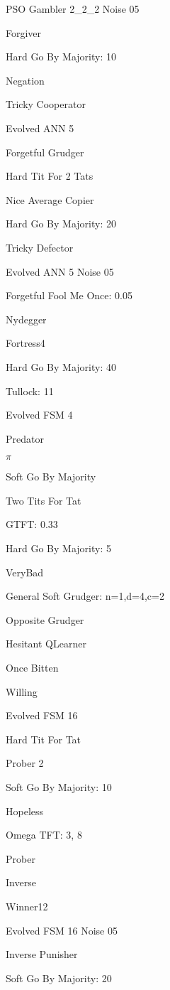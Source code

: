 \item PSO Gambler 2\_2\_2 Noise 05
\item Forgiver
\item Hard Go By Majority: 10
\item Negation
\item Tricky Cooperator
\item Evolved ANN 5
\item Forgetful Grudger
\item Hard Tit For 2 Tats
\item Nice Average Copier
\item Hard Go By Majority: 20
\item Tricky Defector
\item Evolved ANN 5 Noise 05
\item Forgetful Fool Me Once: 0.05
\item Nydegger
\item Fortress4
\item Hard Go By Majority: 40
\item Tullock: 11
\item Evolved FSM 4
\item Predator
\item $\pi$
\item Soft Go By Majority
\item Two Tits For Tat
\item GTFT: 0.33
\item Hard Go By Majority: 5
\item VeryBad
\item General Soft Grudger: n=1,d=4,c=2
\item Opposite Grudger
\item Hesitant QLearner
\item Once Bitten
\item Willing
\item Evolved FSM 16
\item Hard Tit For Tat
\item Prober 2
\item Soft Go By Majority: 10
\item Hopeless
\item Omega TFT: 3, 8
\item Prober
\item Inverse
\item Winner12
\item Evolved FSM 16 Noise 05
\item Inverse Punisher
\item Soft Go By Majority: 20
